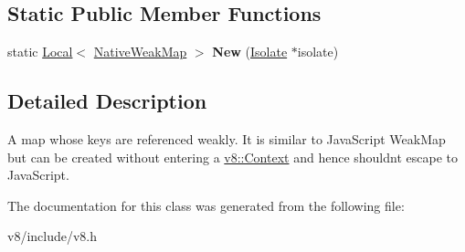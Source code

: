 \subsection*{Static Public Member Functions}
\begin{DoxyCompactItemize}
\item 
static \hyperlink{classv8_1_1Local}{Local}$<$ \hyperlink{classv8_1_1NativeWeakMap}{Native\+Weak\+Map} $>$ {\bfseries New} (\hyperlink{classv8_1_1Isolate}{Isolate} $\ast$isolate)\hypertarget{classv8_1_1NativeWeakMap_afeb513d14fbb8d4537e4a051c71fbf31}{}\label{classv8_1_1NativeWeakMap_afeb513d14fbb8d4537e4a051c71fbf31}

\end{DoxyCompactItemize}


\subsection{Detailed Description}
A map whose keys are referenced weakly. It is similar to Java\+Script Weak\+Map but can be created without entering a \hyperlink{classv8_1_1Context}{v8\+::\+Context} and hence shouldn\textquotesingle{}t escape to Java\+Script. 

The documentation for this class was generated from the following file\+:\begin{DoxyCompactItemize}
\item 
v8/include/v8.\+h\end{DoxyCompactItemize}
